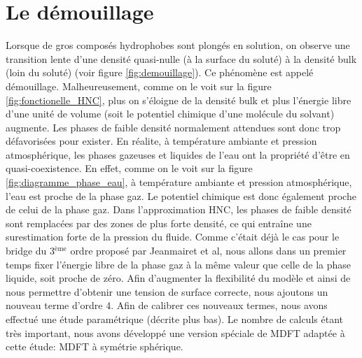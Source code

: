 \section{Le démouillage}
Lorsque de gros composés hydrophobes sont plongés en solution, on observe une transition lente d'une densité quasi-nulle (à la surface du soluté) à la densité bulk (loin du soluté) (voir figure \ref{fig:demouillage}). Ce phénomène est appelé démouillage. Malheureusement, comme on le voit sur la figure \ref{fig:fonctionelle_HNC}, plus on s'éloigne de la densité bulk et plus l'énergie libre d'une unité de volume (soit le potentiel chimique d'une molécule du solvant) augmente. Les phases de faible densité normalement attendues sont donc trop défavorisées pour exister. En réalite, à température ambiante et pression atmosphérique, les phases gazeuses et liquides de l'eau ont la propriété d'être en quasi-coexistence. En effet, comme on le voit sur la figure \ref{fig:diagramme_phase_eau}, à température ambiante et pression atmosphérique, l'eau est proche de la phase gaz. Le potentiel chimique est donc également proche de celui de la phase gaz. Dans l'approximation HNC, les phases de faible densité sont remplacées par des zones de plus forte densité, ce qui entraîne une surestimation forte de la pression du fluide. Comme c'était déjà le cas pour le bridge du 3$^{\text{ème}}$ ordre proposé par Jeanmairet et al\cite{jeanmairet_molecular_2013}, nous allons dans un premier temps fixer l'énergie libre de la phase gaz à la même valeur que celle de la phase liquide, soit proche de zéro. Afin d'augmenter la flexibilité du modèle et ainsi de nous permettre d'obtenir une tension de surface correcte, nous ajoutons un nouveau terme d'ordre 4. Afin de calibrer ces nouveaux termes, nous avons effectué une étude paramétrique (décrite plus bas). Le nombre de calculs étant très important, nous avons développé une version spéciale de MDFT adaptée à cette étude: MDFT à symétrie sphérique. 





